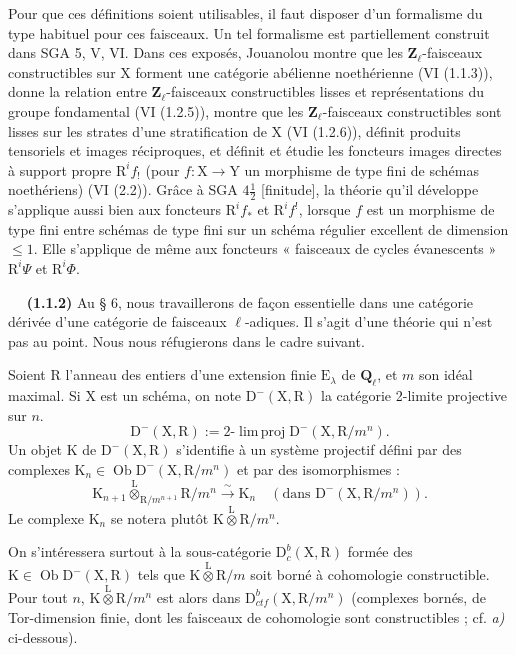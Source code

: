 \documentclass[11pt,leqno]{article}
\newcommand{\Page}[1]{\ifvmode\noindent\else\unskip\ \fi{\footnotesize\textcolor{gray}{[p.\,#1]}}\ \ignorespaces}
\begin{document}
Pour que ces définitions soient utilisables, il faut disposer d’un formalisme du type habituel pour ces faisceaux. Un tel formalisme est partiellement construit dans SGA 5, V, VI. Dans ces exposés, Jouanolou montre que les \(\mathbf{Z}_\ell\)-faisceaux constructibles sur \(\mathrm{X}\) forment une catégorie abélienne noethérienne (VI (1.1.3)), donne la relation entre \(\mathbf{Z}_\ell\)-faisceaux constructibles lisses et représentations du groupe fondamental (VI (1.2.5)), montre que les \(\mathbf{Z}_\ell\)-faisceaux constructibles sont lisses sur les strates d’une stratification de \(\mathrm{X}\) (VI (1.2.6)), définit produits tensoriels et images réciproques, et définit et étudie les foncteurs images directes à support propre \(\mathrm{R}^i f_!\) (pour \(f:\mathrm{X}\to\mathrm{Y}\) un morphisme de type fini de schémas noethériens) (VI (2.2)). Grâce à SGA \(4\frac{1}{2}\) [finitude], la théorie qu’il développe s’applique aussi bien aux foncteurs \(\mathrm{R}^i f_*\) et \(\mathrm{R}^i f^!\), lorsque \(f\) est un morphisme de type fini entre schémas de type fini sur un schéma régulier excellent de dimension \(\leq1\). Elle s’applique de même aux foncteurs « faisceaux de cycles évanescents » \(\mathrm{R}^i\Psi\) et \(\mathrm{R}^i\Phi\).

\Page{148}
\textbf{(1.1.2)} Au § 6, nous travaillerons de façon essentielle dans une catégorie dérivée d’une catégorie de faisceaux \(\ell\)-adiques. Il s’agit d’une théorie qui n’est pas au point. Nous nous réfugierons dans le cadre suivant.

Soient \(\mathrm{R}\) l’anneau des entiers d’une extension finie \(\mathrm{E}_\lambda\) de \(\mathbf{Q}_\ell\), et \(m\) son idéal maximal. Si \(\mathrm{X}\) est un schéma, on note \(\mathrm{D}^-(\mathrm{X},\mathrm{R})\) la catégorie 2-limite projective sur \(n\).
\[
\mathrm{D}^-(\mathrm{X},\mathrm{R})
:=2\text{-}\operatorname{lim\,proj}\mathrm{D}^-(\mathrm{X},\mathrm{R}/m^n).
\]
Un objet \(\mathrm{K}\) de \(\mathrm{D}^-(\mathrm{X},\mathrm{R})\) s’identifie à un système projectif défini par des complexes \(\mathrm{K}_n\in\operatorname{Ob}\mathrm{D}^-(\mathrm{X},\mathrm{R}/m^n)\) et par des isomorphismes :
\[
\mathrm{K}_{n+1}\overset{\mathrm{L}}{\otimes}_{\mathrm{R}/m^{n+1}}\mathrm{R}/m^n
\overset{\sim}{\to}\mathrm{K}_n
\quad
(\text{dans }\mathrm{D}^-(\mathrm{X},\mathrm{R}/m^n)).
\]
Le complexe \(\mathrm{K}_n\) se notera plutôt \(\mathrm{K}\overset{\mathrm{L}}{\otimes}\mathrm{R}/m^n\).

On s’intéressera surtout à la sous-catégorie \(\mathrm{D}_c^b(\mathrm{X},\mathrm{R})\) formée des \(\mathrm{K}\in\operatorname{Ob}\mathrm{D}^-(\mathrm{X},\mathrm{R})\) tels que \(\mathrm{K}\overset{\mathrm{L}}{\otimes}\mathrm{R}/m\) soit borné à cohomologie constructible. Pour tout \(n\), \(\mathrm{K}\overset{\mathrm{L}}{\otimes}\mathrm{R}/m^n\) est alors dans \(\mathrm{D}_{\mathit{ctf}}^b(\mathrm{X},\mathrm{R}/m^n)\) (complexes bornés, de Tor-dimension finie, dont les faisceaux de cohomologie sont constructibles ; cf. \textit{a)} ci-dessous).
\end{document}
